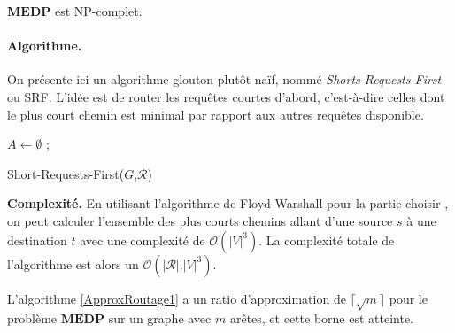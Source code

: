 \begin{theorem}[Admis]
$\mathbf{MEDP}$ est NP-complet.
\end{theorem}


\paragraph{Algorithme.} On présente ici un algorithme glouton plutôt naïf, nommé \textit{Shorts-Requests-First} ou SRF. L'idée est de router les requêtes courtes d'abord, c'est-à-dire celles dont le plus court chemin est minimal par rapport aux autres requêtes disponible.


\begin{algorithm}[!h]
$A \gets \emptyset$ ;\\
\caption{Short-Requests-First($G$,$\mathcal{R}$)}\label{ApproxRoutage1}
\end{algorithm}

\textbf{Complexité.} En utilisant l'algorithme de Floyd-Warshall pour la partie \og choisir \fg{}, on peut calculer l'ensemble des plus courts chemins allant d'une source $s$ à une destination $t$ avec une complexité de $\mathcal{O}(|V|^3)$. La complexité totale de l'algorithme est alors un $\mathcal{O}(|\mathcal{R}|.|V|^3)$.


\begin{theorem}\label{ApproxRoutage2}
L'algorithme \ref{ApproxRoutage1} a un ratio d'approximation de $\lceil \sqrt{m} \rceil$ pour le problème $\mathbf{MEDP}$ sur un graphe avec $m$ arêtes, et cette borne est atteinte.
\end{theorem}

